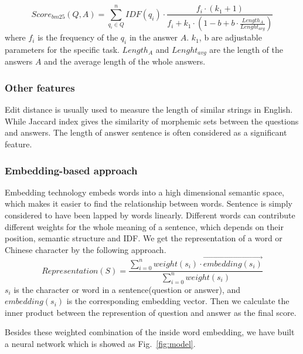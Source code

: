 \documentclass{llncs}
\begin{document}
\begin{equation}
Score_{bm25}(Q,A)=\sum_{q_i \in Q}^nIDF(q_i)\cdot \frac{f_i\cdot(k_1+1)}{f_i + k_1 \cdot (1-b +b\cdot \frac{Length_A}{Lenght_{avg}})}  
\label{eq:bm25}
\end{equation}
where $f_i$ is the frequency of the $q_i$ in the answer $A$. $k_1$, b are adjustable parameters for the specific task. $Length_A$ and $Lenght_{avg}$ are the length of the answers $A$ and the average length of the whole answers.

\subsubsection{Other features}
Edit distance is usually used to measure the length of similar strings in English. While Jaccard index gives the similarity of morphemic sets between the questions and answers. The length of answer sentence is often considered as a significant feature.


\subsubsection{Embedding-based approach}
\label{sec:embedding}
Embedding technology embeds words into a high dimensional semantic space, which makes it easier to find the relationship between words. Sentence is simply considered to have been lapped by words linearly. Different words can contribute different weights for the whole meaning of a sentence, which depends on their position, semantic structure and IDF.
We get the representation of a word or Chinese character by the following approach.
\begin{equation}
Representation(S) = \frac{\sum_{i=0}^n weight(s_i)\cdot \overrightarrow { embedding(s_i)} }{\sum_{i=0}^n weight(s_i) }
\label{eq:representation}
\end{equation}
$s_i$ is the character or word in a sentence(question or answer), and $embedding(s_i)$ is the corresponding embedding vector. Then we calculate the inner product between the represention of question and answer as the final score.

Besides these weighted combination of the inside word embedding, we have built a neural network which is showed as Fig.~\ref{fig:model}. 
\end{document}

